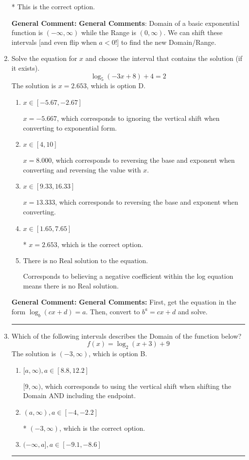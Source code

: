 \documentclass{extbook}[14pt]
\newcommand{\litem}[1]{\item #1

\rule{\textwidth}{0.4pt}}
\begin{document}
\begin{enumerate}
{\begin{enumerate}[label=\Alph*.]
* This is the correct option.
\end{enumerate}

\textbf{General Comment:} \textbf{General Comments}: Domain of a basic exponential function is $(-\infty, \infty)$ while the Range is $(0, \infty)$. We can shift these intervals [and even flip when $a<0$!] to find the new Domain/Range.
}
\litem{
Solve the equation for $x$ and choose the interval that contains the solution (if it exists).
\[ \log_{5}{(-3x+8)}+4 = 2 \]The solution is \( x = 2.653 \), which is option D.\begin{enumerate}[label=\Alph*.]
\item \( x \in [-5.67, -2.67] \)

$x = -5.667$, which corresponds to ignoring the vertical shift when converting to exponential form.
\item \( x \in [4, 10] \)

$x = 8.000$, which corresponds to reversing the base and exponent when converting and reversing the value with $x$.
\item \( x \in [9.33, 16.33] \)

$x = 13.333$, which corresponds to reversing the base and exponent when converting.
\item \( x \in [1.65, 7.65] \)

* $x = 2.653$, which is the correct option.
\item \( \text{There is no Real solution to the equation.} \)

Corresponds to believing a negative coefficient within the log equation means there is no Real solution.
\end{enumerate}

\textbf{General Comment:} \textbf{General Comments:} First, get the equation in the form $\log_b{(cx+d)} = a$. Then, convert to $b^a = cx+d$ and solve.
}
\litem{
Which of the following intervals describes the Domain of the function below?
\[ f(x) = \log_2{(x+3)}+9 \]The solution is \( (-3, \infty) \), which is option B.\begin{enumerate}[label=\Alph*.]
\item \( [a, \infty), a \in [8.8, 12.2] \)

$[9, \infty)$, which corresponds to using the vertical shift when shifting the Domain AND including the endpoint.
\item \( (a, \infty), a \in [-4, -2.2] \)

* $(-3, \infty)$, which is the correct option.
\item \( (-\infty, a], a \in [-9.1, -8.6] \)


\end{enumerate}}
\end{enumerate}
\end{document}
